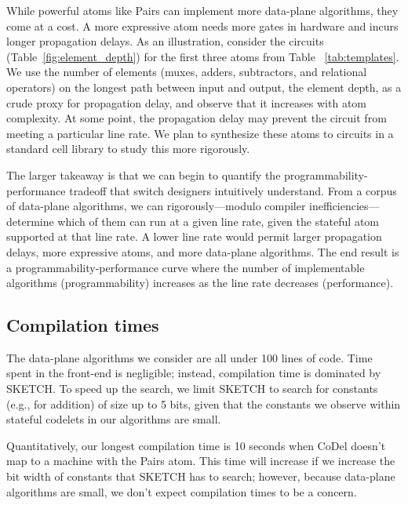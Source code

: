 While powerful atoms like Pairs can implement more data-plane algorithms, they
come at a cost.  A more expressive atom needs more gates in hardware and incurs
longer propagation delays.  As an illustration, consider the circuits
(Table~\ref{fig:element_depth}) for the first three atoms from Table
~\ref{tab:templates}. We use the number of elements (muxes, adders,
subtractors, and relational operators) on the longest path between input and
output, the element depth, as a crude proxy for propagation delay, and observe
that it increases with atom complexity. At some point, the propagation delay
may prevent the circuit from meeting a particular line rate.  We plan to
synthesize these atoms to circuits in a standard cell library to study this
more rigorously.

The larger takeaway is that we can begin to quantify the
programmability-performance tradeoff that switch designers intuitively
understand. From a corpus of data-plane algorithms, we can rigorously---modulo
compiler inefficiencies---determine which of them can run at a given line rate,
given the stateful atom supported at that line rate. A lower line rate would
permit larger propagation delays, more expressive atoms, and more data-plane
algorithms. The end result is a programmability-performance curve where the
number of implementable algorithms (programmability) increases as the line rate
decreases (performance).

\subsection{Compilation times}
The data-plane algorithms we consider are all under 100 lines of code.  Time
spent in the front-end is negligible; instead, compilation time is dominated by
SKETCH. To speed up the search, we limit SKETCH to search for constants (e.g.,
for addition) of size up to 5 bits, given that the constants we observe within
stateful codelets in our algorithms are small.

Quantitatively, our longest compilation time is
10 seconds when CoDel doesn't map to a \absmachine machine with the Pairs atom.
This time will increase if we increase the bit width of constants that SKETCH
has to search; however, because data-plane algorithms are small,
we don't expect compilation times to be a concern.
